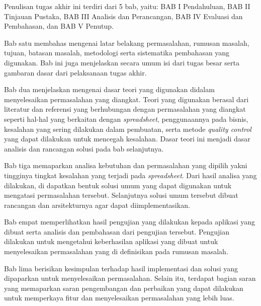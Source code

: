 Penulisan tugas akhir ini terdiri dari 5 bab, yaitu: BAB I Pendahuluan, BAB II Tinjauan Pustaka, BAB III Analisis dan Perancangan, BAB IV Evaluasi dan Pembahasan, dan BAB V Penutup. 

Bab satu membahas mengenai latar belakang permasalahan, rumusan masalah, tujuan, batasan masalah, metodologi serta sistematika pembahasan yang digunakan. Bab ini juga menjelaskan secara umum isi dari tugas besar serta gambaran dasar dari pelaksanaan tugas akhir.

Bab dua menjelaskan mengenai dasar teori yang digunakan didalam menyelesaikan permasalahan yang diangkat. Teori yang digunakan berasal dari literatur dan referensi yang berhubungan dengan permasalahan yang diangkat seperti hal-hal yang berkaitan dengan \textit{spreadsheet}, penggunaannya pada bisnis, kesalahan yang sering dilakukan dalam pembuatan, serta metode \textit{quality control} yang dapat dilakukan untuk mencegah kesalahan. Dasar teori ini menjadi dasar analisis dan rancangan solusi pada bab selanjutnya.

Bab tiga memaparkan analisa kebutuhan dan permasalahan yang dipilih yakni tingginya tingkat kesalahan yang terjadi pada \textit{spreadsheet}. Dari hasil analisa yang dilakukan, di dapatkan bentuk solusi umum yang dapat digunakan untuk mengatasi permasalahan tersebut. Selanjutnya solusi umum tersebut dibuat rancangan dan arsitekturnya agar dapat diimplementasikan.

Bab empat memperlihatkan hasil pengujian yang dilakukan kepada aplikasi yang dibuat serta analisis dan pembahasan dari pengujian tersebut. Pengujian dilakukan untuk mengetahui keberhasilan aplikasi yang dibuat untuk menyelesaikan permasalahan yang di definisikan pada rumusan masalah.

Bab lima berisikan kesimpulan terhadap hasil implementasi dan solusi yang dipaparkan untuk menyelesaikan permasalahan. Selain itu, terdapat bagian saran yang memaparkan saran pengembangan dan perbaikan yang dapat dilakukan untuk memperkaya fitur dan menyelesaikan permasalahan yang lebih luas.

